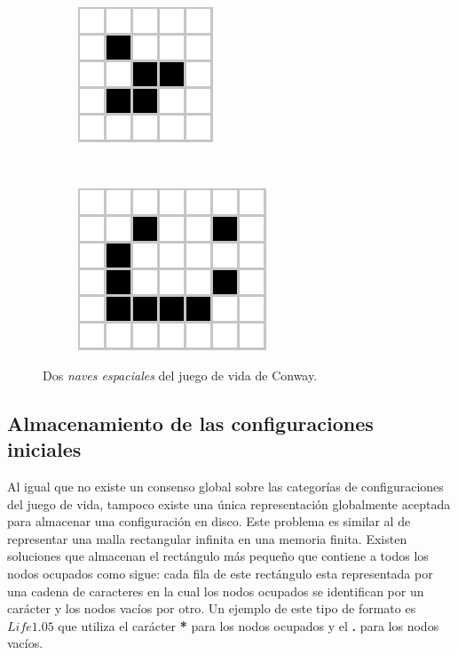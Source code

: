 \documentclass[../proyecto.tex]{memoir}
\begin{document}
\begin{figure}[H]
	\centering
	\begin{subfigure}[b]{0.3\linewidth} 
        \centering
        \includegraphics[height=.45\linewidth]{./images/glider.png}
        \caption{}
        \label{fig:glider_evo}
    \end{subfigure}
    \ 
	\begin{subfigure}[b]{0.3\linewidth} 
        \centering
        \includegraphics[height=0.45\linewidth]{./images/lightweightspaceship.png}
        \caption{}
        \label{fig:lightweightspaceship_evo}
    \end{subfigure}
	\caption{Dos \textit{naves espaciales} del juego de vida de Conway.}
	\label{fig:congIniciales4}
\end{figure} 

\subsection{Almacenamiento de las configuraciones iniciales} \label{rle}

Al igual que no existe un consenso global sobre las categorías de configuraciones del juego de vida, tampoco existe una única representación globalmente aceptada para almacenar una configuración en disco. Este problema es similar al de representar una malla rectangular infinita en una memoria finita. Existen soluciones que almacenan el rectángulo más pequeño que contiene a todos los nodos ocupados como sigue: cada fila de este rectángulo esta representada por una cadena de caracteres en la cual los nodos ocupados se identifican por un carácter y los nodos vacíos por otro. Un ejemplo de este tipo de formato es $Life 1.05$ que utiliza el carácter \textbf{*} para los nodos ocupados y el \textbf{.} para los nodos vacíos. 
\end{document}
